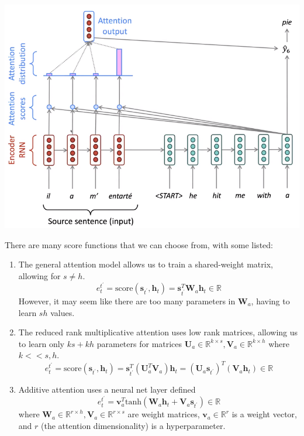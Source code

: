 \documentclass{article}
\theoremstyle{definition}
\theoremstyle{remark}
\theoremstyle{definition}
\begin{document}
\begin{center}
    \includegraphics[scale=0.4]{img/seq2seq_attention.png}
\end{center}
There are many score functions that we can choose from, with some listed: 
\begin{enumerate}
    \item The general attention model allows us to train a shared-weight matrix, allowing for $s \neq h$. 
    \[e^{t^\prime}_t = \mathrm{score}(\mathbf{s}_{t^\prime}, \mathbf{h}_t) = \mathbf{s}_{t^\prime}^T \mathbf{W}_a \mathbf{h}_t \in \mathbb{R}\]
    However, it may seem like there are too many parameters in $\mathbf{W}_a$, having to learn $sh$ values. 

    \item The reduced rank multiplicative attention uses low rank matrices, allowing us to learn only $ks + kh$ parameters for matrices $\mathbf{U}_a \in \mathbb{R}^{k \times s}, \mathbf{V}_a \in \mathbb{R}^{k \times h}$ where $k << s, h$. 
    \[e^{t^\prime}_t = \mathrm{score}(\mathbf{s}_{t^\prime}, \mathbf{h}_t) = \mathbf{s}_{t^\prime}^T (\mathbf{U}_a^T \mathbf{V}_a) \mathbf{h}_t = (\mathbf{U}_a \mathbf{s}_{t^\prime})^T (\mathbf{V}_a \mathbf{h}_t) \in \mathbb{R}\]

    \item Additive attention uses a neural net layer defined 
    \[e^{t^\prime}_t = \mathbf{v}_a^T \mathrm{tanh}(\mathbf{W}_a \mathbf{h}_t + \mathbf{V}_a \mathbf{s}_{t^\prime}) \in \mathbb{R}\]
    where $\mathbf{W}_a \in \mathbb{R}^{r \times h}, \mathbf{V}_a \in \mathbb{R}^{r \times s}$ are weight matrices, $\mathbf{v}_a \in \mathbb{R}^r$ is a weight vector, and $r$ (the attention dimensionality) is a hyperparameter. 
\end{enumerate}
\end{document}
